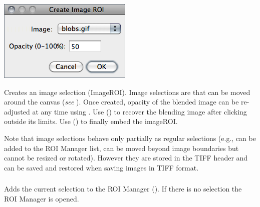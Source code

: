 \begin{minipage}[c][1\totalheight][t]{0.35\columnwidth}%
\includegraphics[scale=0.55]{images/ImageToSelection}%
\end{minipage}%
\begin{minipage}[c][1\totalheight][t]{0.65\columnwidth}%
Creates an image selection (ImageROI).
Image selections are   that can be moved
around the canvas (\emph{see} ).
Once created, opacity of the blended image can be re-adjusted at any
time using .
Use   ()
to recover the blending image after clicking outside its limits. Use
  ()
to finally embed the imageROI.%
\end{minipage}

Note that image selections behave only partially as regular selections
(e.g., can be added to the ROI Manager list, can be moved beyond image
boundaries but cannot be resized or rotated). However they are stored
in the TIFF header and can be saved and restored when saving images
in TIFF format.




\subsubsection[{\protect\userinterface{Add to Manager {[}t{]}}}]{\protect{}\label{sub:Add-to-Manager}\improvement{}}

Adds the current selection to the ROI Manager ().
If there is no selection the ROI Manager is opened.


